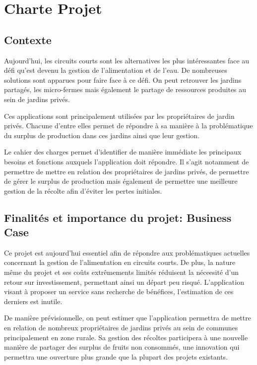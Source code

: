 \documentclass{article}
\begin{document}
\vspace{8 mm}


\section{Charte Projet}

\subsection{Contexte}

Aujourd'hui, les circuits courts sont les alternatives les plus intéressantes face au défi qu'est devenu la gestion de l'alimentation et de l'eau. De nombreuses solutions sont apparues pour faire face à ce défi. On peut retrouver les jardins partagés, les micro-fermes mais également le partage de ressources produites au sein de jardins privés. 

Ces applications sont principalement utilisées par les propriétaires de jardin privés. Chacune d'entre elles permet de répondre à sa manière à la problématique du surplus de production dans ces jardins ainsi que leur gestion.

Le cahier des charges permet d'identifier de manière immédiate les principaux besoins et fonctions auxquels l'application doit répondre. Il s'agit notamment de permettre de mettre en relation des propriétaires de jardins privés, de permettre de gérer le surplus de production mais également de permettre une meilleure gestion de la récolte afin d'éviter les pertes initiales.


\subsection{Finalités et importance du projet: Business Case}

Ce projet est aujourd'hui essentiel afin de répondre aux problématiques actuelles concernant la gestion de l'alimentation en circuits courts. De plus, la nature même du projet et ses coûts extrêmements limités réduisent la néceesité d'un retour sur investissement, permettant ainsi un départ peu risqué. L'application visant à proposer un service sans recherche de bénéfices, l'estimation de ces derniers est inutile.

De manière prévisionnelle, on peut estimer que l'application permettra de mettre en relation de nombreux propriétaires de jardins privés au sein de communes principalement en zone rurale. Sa gestion des récoltes participera à une nouvelle manière de partager des surplus de fruits non consommés, une innovation qui permettra une ouverture plus grande que la plupart des projets existants.
\end{document}
